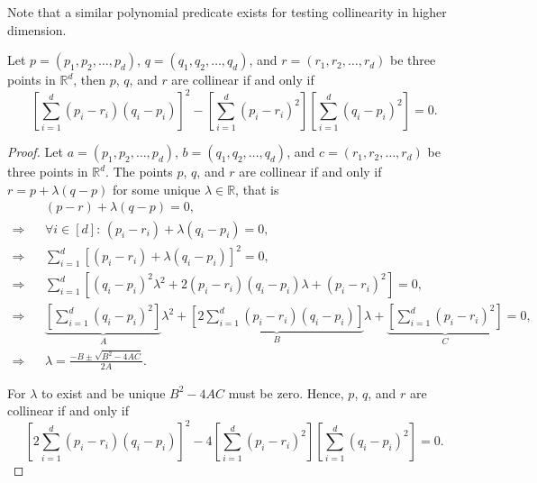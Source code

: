 Note that a similar polynomial predicate exists for testing collinearity in
higher dimension.
\begin{lemma}
Let $p = (p_1,p_2,\ldots,p_d)$, $q = (q_1,q_2,\ldots,q_d)$,
and $r=(r_1,r_2,\ldots,r_d)$ be three points in $\mathbb{R}^d$, then $p$, $q$, and
$r$ are collinear if and only if
\begin{displaymath}
{\left[\sum_{i=1}^{d}(p_i-r_i)(q_i-p_i)\right]}^2 -
\left[\sum_{i=1}^{d}{(p_i-r_i)}^2\right]\left[\sum_{i=1}^{d}{(q_i-p_i)}^2\right] =
0.
\end{displaymath}
\end{lemma}
\begin{proof}
Let $a = (p_1,p_2,\ldots,p_d)$, $b = (q_1,q_2,\ldots,q_d)$, and
$c=(r_1,r_2,\ldots,r_d)$ be three points in $\mathbb{R}^d$. The points $p$, $q$,
and $r$ are collinear if and only if $r = p + \lambda (q-p)$ for some unique
$\lambda \in \mathbb{R}$, that is
\begin{align*}
	&&(p-r) + \lambda (q-p) = 0,\\
	\Rightarrow&& \forall i \in [d] \colon\, (p_i-r_i) + \lambda (q_i-p_i) = 0,\\
	\Rightarrow&& \sum_{i=1}^{d}{\left[(p_i-r_i) + \lambda (q_i-p_i)\right]}^2
	= 0,\\
	\Rightarrow&& \sum_{i=1}^{d}\left[{(q_i-p_i)}^2 \lambda^2 + 2(p_i-r_i)(q_i-p_i) \lambda +
		{(p_i-r_i)}^2\right] = 0,\\
	\Rightarrow&& \underbrace{\left[\sum_{i=1}^{d}{(q_i-p_i)}^2\right]}_{A} \lambda^2 +
		\underbrace{\left[2\sum_{i=1}^{d}(p_i-r_i)(q_i-p_i)\right]}_{B} \lambda +
		\underbrace{\left[\sum_{i=1}^{d}{(p_i-r_i)}^2\right]}_{C} = 0,\\
	\Rightarrow&& \lambda = \frac{-B \pm \sqrt{B^2-4AC}}{2A}.
\end{align*}

For $\lambda$ to exist and be unique $B^2-4AC$ must be zero.
Hence, $p$, $q$, and $r$ are collinear if and only if
\begin{displaymath}
	{\left[2\sum_{i=1}^{d}(p_i-r_i)(q_i-p_i)\right]}^2
	- 4 \left[\sum_{i=1}^{d}{(p_i-r_i)}^2\right]\left[\sum_{i=1}^{d}{(q_i-p_i)}^2\right]
	= 0.
\end{displaymath}
\end{proof}

